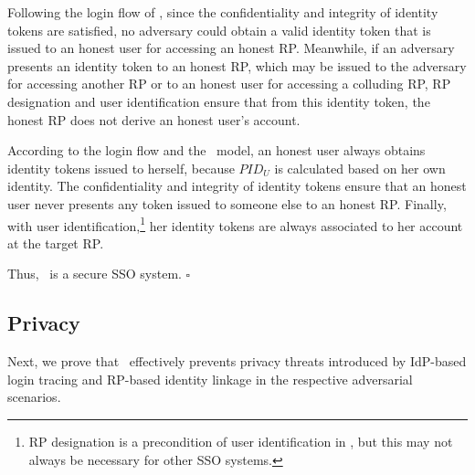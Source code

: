 Following the login flow of \usso, since the confidentiality and integrity of identity tokens are satisfied, no adversary could obtain a valid identity token that is issued to an honest user for accessing an honest RP. %
Meanwhile, if an adversary presents an identity token to an honest RP, which may be issued to the adversary for accessing another RP or to an honest user for accessing a colluding RP, RP designation and user identification ensure that from this identity token, the honest RP does not derive an honest user's account.

According to the login flow and the \dyu~model, an honest user always obtains identity tokens issued to herself, because $PID_U$ is calculated based on her own identity.
The confidentiality and integrity of identity tokens ensure that an honest user never presents any token issued to someone else to an honest RP. Finally, with user identification,\footnote{RP designation is a precondition of user identification in \usso, but this may not always be necessary for other SSO systems.} her identity tokens are always associated to her account at the target RP.

Thus, \usso~is a secure SSO system.
\hfill $\square$


\subsection{Privacy}
\label{sec-:analysis}
Next, we prove that \usso~effectively prevents privacy threats introduced by IdP-based login tracing and RP-based identity linkage in the respective adversarial scenarios.

